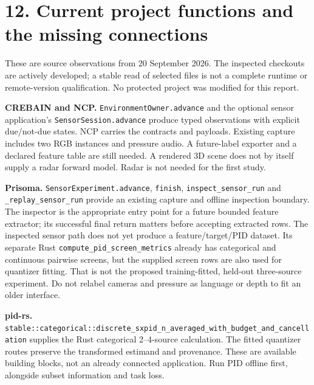 \documentclass[11pt,a4paper]{article}
\let\PidSavedTexttt\texttt
\renewcommand{\texttt}[1]{\PidSavedTexttt{#1}}
\begin{document}
\par{}

\section{12. Current project functions and the missing connections}\label{current-project-functions-and-the-missing-connections}

These are source observations from 20 September 2026. The inspected checkouts are actively developed; a stable read of selected files is not a complete runtime or remote-version qualification. No protected project was modified for this report.

\textbf{CREBAIN and NCP.} \texttt{EnvironmentOwner.\allowbreak{}advance} and the optional sensor application's \texttt{SensorSession.\allowbreak{}advance} produce typed observations with explicit due/not-due states. NCP carries the contracts and payloads. Existing capture includes two RGB instances and pressure audio. A future-label exporter and a declared feature table are still needed. A rendered 3D scene does not by itself supply a radar forward model. Radar is not needed for the first study.

\textbf{Prisoma.} \texttt{SensorExperiment.\allowbreak{}advance}, \texttt{finish}, \texttt{inspect\_\allowbreak{}sensor\_\allowbreak{}run} and \texttt{\_\allowbreak{}replay\_\allowbreak{}sensor\_\allowbreak{}run} provide an existing capture and offline inspection boundary. The inspector is the appropriate entry point for a future bounded feature extractor; its successful final return matters before accepting extracted rows. The inspected sensor path does not yet produce a feature/target/PID dataset. Its separate Rust \texttt{compute\_\allowbreak{}pid\_\allowbreak{}screen\_\allowbreak{}metrics} already has categorical and continuous pairwise screens, but the supplied screen rows are also used for quantizer fitting. That is not the proposed training-fitted, held-out three-source experiment. Do not relabel cameras and pressure as language or depth to fit an older interface.

\textbf{pid-rs.} \texttt{stable::\allowbreak{}categorical::\allowbreak{}discrete\_\allowbreak{}sxpid\_\allowbreak{}n\_\allowbreak{}averaged\_\allowbreak{}with\_\allowbreak{}budget\_\allowbreak{}and\_\allowbreak{}cancellation} supplies the Rust categorical 2--4-source calculation. The fitted quantizer routes preserve the transformed estimand and provenance. These are available building blocks, not an already connected application. Run PID offline first, alongside subset information and task loss.
\end{document}
